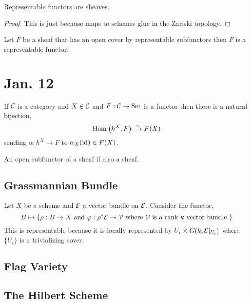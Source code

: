 \documentclass[12pt]{article}
\begin{document}
\begin{prop}
Representable functors are sheaves. 
\end{prop}

\begin{proof}
This is just because maps to schemes glue in the Zariski topology.
\end{proof}

\begin{thm}
Let $F$ be a sheaf that has an open cover by representable subfunctors then $F$ is a representable functor.
\end{thm}

\section{Jan. 12}

\newcommand{\Set}{\mathrm{Set}}

\begin{prop}[Yoneda]
If $\mathcal{C}$ is a category and $X \in \mathcal{C}$ and $F : \C \to \Set$ is a functor then there is a natural bijection,
\[ \mathrm{Hom}_{} \left( h^X, F \right) \xrightarrow{\sim} F(X) \]
sending $\alpha : h^X \to F$ to $\alpha_X(\mathrm{id}) \in F(X)$. 
\end{prop}

\begin{prop}
An open subfunctor of a sheaf if also a sheaf.
\end{prop}

\subsection{Grassmannian Bundle}

Let $X$ be a scheme and $\mathcal{E}$ a vector bundle on $\mathcal{E}$.
Consider the functor,
\[ B \mapsto \{ \rho : B \to X \text{ and } \varphi : \rho^* \mathcal{E} \twoheadrightarrow \mathcal{V} \text{ where } \mathcal{V} \text{ is a rank } k \text{ vector bundle } \} \]
This is representable because it is locally represented by $U_i \times G(k, \mathcal{E}|_{U_i})$ where $\{ U_i \}$ is a trivializing cover.

\subsection{Flag Variety}



\subsection{The Hilbert Scheme}
\end{document}
